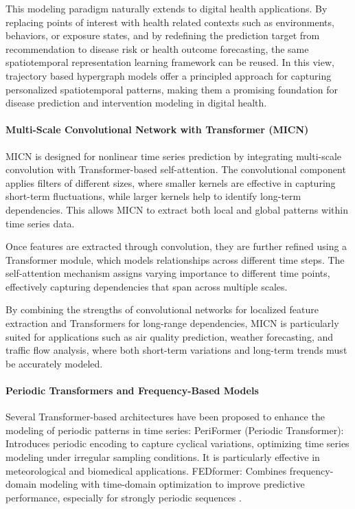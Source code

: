 \documentclass[acmsmall]{acmart}
\begin{document}
This modeling paradigm naturally extends to digital health applications. By replacing points of interest with health related contexts such as environments, behaviors, or exposure states, and by redefining the prediction target from recommendation to disease risk or health outcome forecasting, the same spatiotemporal representation learning framework can be reused. In this view, trajectory based hypergraph models offer a principled approach for capturing personalized spatiotemporal patterns, making them a promising foundation for disease prediction and intervention modeling in digital health.

\paragraph{Multi-Scale Convolutional Network with Transformer (MICN)} MICN \cite{wang2023micn}is designed for nonlinear time series prediction by integrating multi-scale convolution with Transformer-based self-attention. The convolutional component applies filters of different sizes, where smaller kernels are effective in capturing short-term fluctuations, while larger kernels help to identify long-term dependencies. This allows MICN to extract both local and global patterns within time series data.

Once features are extracted through convolution, they are further refined using a Transformer module, which models relationships across different time steps. The self-attention mechanism assigns varying importance to different time points, effectively capturing dependencies that span across multiple scales.

By combining the strengths of convolutional networks for localized feature extraction and Transformers for long-range dependencies, MICN is particularly suited for applications such as air quality prediction, weather forecasting, and traffic flow analysis, where both short-term variations and long-term trends must be accurately modeled.

\paragraph{Periodic Transformers and Frequency-Based Models}Several Transformer-based architectures have been proposed to enhance the modeling of periodic patterns in time series: PeriFormer (Periodic Transformer): Introduces periodic encoding to capture cyclical variations, optimizing time series modeling under irregular sampling conditions. It is particularly effective in meteorological and biomedical applications.
FEDformer: Combines frequency-domain modeling with time-domain optimization to improve predictive performance, especially for strongly periodic sequences \cite{piao2024frednormer}.
\end{document}
